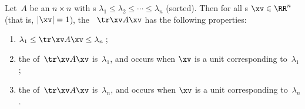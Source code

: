 \begin{theorem}%
\label{thm:optqform}
Let~\(A\) be an \(n\times n\)  with s \(\lambda_1\leq\lambda_2\leq\cdots\leq\lambda_n\) (sorted). 
Then for all s \(\xv\in\RR^n\) (that is, \(|\xv|=1\)), the ~\(\tr\xv A\xv\) has the following properties:
\begin{enumerate}
\item \(\lambda_1\leq \tr\xv A\xv\leq\lambda_n\)\,;
\item the  of~\(\tr\xv A\xv\) is~\(\lambda_1\), and occurs when \(\xv\) is a unit  corresponding to~\(\lambda_1\);
\item the  of~\(\tr\xv A\xv\) is~\(\lambda_n\), and occurs when \(\xv\) is a unit  corresponding to~\(\lambda_n\).
\end{enumerate}
\end{theorem}


